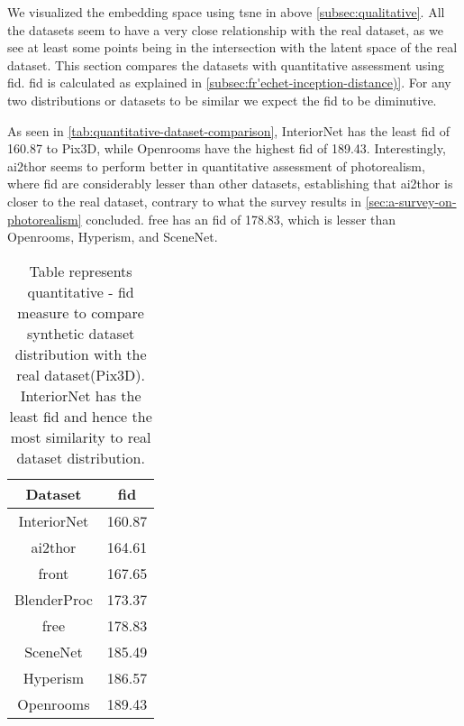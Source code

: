 We visualized the embedding space using \gls{tsne} in above \autoref{subsec:qualitative}.
All the datasets seem to have a very close relationship with the real dataset, as we see at least some points being in the intersection with the latent space of the real dataset.
This section compares the datasets with quantitative assessment using \gls{fid}.
\gls{fid} is calculated as explained in \autoref{subsec:fr'echet-inception-distance)}.
For any two distributions or datasets to be similar we expect the \gls{fid} to be diminutive.

As seen in \autoref{tab:quantitative-dataset-comparison}, InteriorNet has the least \gls{fid} of 160.87 to Pix3D, while Openrooms have the highest \gls{fid} of 189.43.
Interestingly, \gls{ai2thor} seems to perform better in quantitative assessment of photorealism,
where \gls{fid} are considerably lesser than other datasets,
establishing that \gls{ai2thor} is closer to the real dataset, contrary to what the survey results in \autoref{sec:a-survey-on-photorealism} concluded.
\gls{free} has an \gls{fid} of 178.83, which is lesser than Openrooms, Hyperism, and SceneNet.

\begin{table}[ht]
    \centering
    \begin{tabular}{|c |c |}
        \hline
        Dataset & \gls{fid} \\ [0.5ex]
        \hline\hline
        InteriorNet  & 160.87 \\
        \hline
        \gls{ai2thor} & 164.61 \\
        \hline
        \gls{front}  & 167.65 \\
        \hline
        BlenderProc  & 173.37 \\
        \hline
        \gls{free} & 178.83 \\
        \hline
        SceneNet & 185.49 \\
        \hline
        Hyperism  & 186.57 \\
        \hline
        Openrooms & 189.43 \\[1ex]
        \hline
    \end{tabular}
    \caption[\gls{fid} Comparison for Synthetic Datasets with Real Dataset.]{Table represents quantitative - \gls{fid} measure to compare synthetic dataset distribution with the real dataset(Pix3D).
    InteriorNet has the least \gls{fid} and hence the most similarity to real dataset distribution.}
    \label{tab:quantitative-dataset-comparison}
\end{table}

